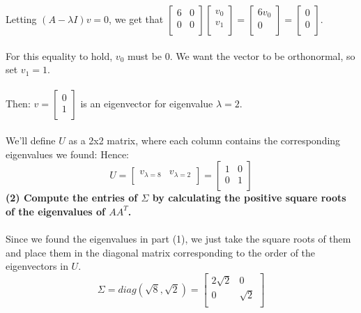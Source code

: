 \documentclass[11pt]{article}
\begin{document}
Letting $(A - \lambda I)v = 0$, we get that $ \begin{bmatrix}
6 & 0 \\
0 & 0 \\
\end{bmatrix} \begin{bmatrix}
v_0 \\
v_1 \\
\end{bmatrix} = \begin{bmatrix}
6v_0 \\
0 \\
\end{bmatrix} = \begin{bmatrix}
0 \\
0 \\
\end{bmatrix} $. \\\\
For this equality to hold, $v_0$ must be 0. We want the vector to be orthonormal, so set $v_1 = 1$. \\\\
Then: $v = \begin{bmatrix}
0 \\
1 \\
\end{bmatrix}$ is an eigenvector for eigenvalue $\lambda = 2$. \\\\
We'll define $U$ as a 2x2 matrix, where each column contains the corresponding eigenvalues we found:
Hence:
$$ \boxed{ U = \begin{bmatrix} 
v_{\lambda = 8} & v_{\lambda = 2} \\
\end{bmatrix} = \begin{bmatrix}
1 & 0\\
0 & 1\\
\end{bmatrix}}$$
\textbf{(2) Compute the entries of $\Sigma$ by calculating the positive square roots of the eigenvalues of $AA^T$.}
\\\\
Since we found the eigenvalues in part (1), we just take the square roots of them and place them in the diagonal matrix corresponding to the order of the eigenvectors in $U$.
$$\boxed{\Sigma = diag(\sqrt8, \sqrt2) = \begin{bmatrix}
2\sqrt2 & 0 \\
0 & \sqrt2 \\
\end{bmatrix}} $$
\end{document}
